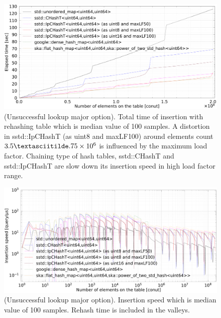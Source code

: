 \begin{figure}[h]
  \includegraphics[scale=0.24]{./fig_bench_usm/insert_et_med.pdf}
  \caption{
    (Unsuccessful lookup major option). Total time of insertion with rehashing table which is median value of 100 samples.
    A distortion in sstd::IpCHashT (as uint8 and maxLF100) around elements count $3.5 \textasciitilde.75\times10^6$ is influenced by the maximum load factor.
    Chaining type of hash tables, sstd::CHashT and sstd::IpCHashT are slow down its insertion speed in high load factor range.
  }
  \label{fig_bench_insert_wRehash_um}
\end{figure}

\begin{figure}[h]
  \hspace{-3mm}
  \includegraphics[scale=0.24]{./fig_bench_usm/insert_med.pdf}
  \caption{
    (Unsuccessful lookup major option). Insertion speed which is median value of 100 samples.
    Rehash time is included in the valleys.
  }
  \label{fig_bench_insert_um}
\end{figure}

